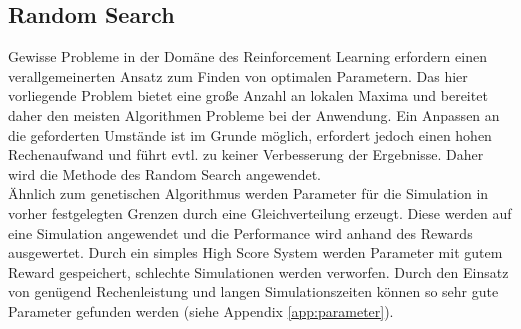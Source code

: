 	\subsection{Random Search}
		Gewisse Probleme in der Domäne des Reinforcement Learning erfordern einen verallgemeinerten Ansatz zum Finden von optimalen Parametern. Das hier vorliegende Problem bietet eine große Anzahl an lokalen Maxima und bereitet daher den meisten Algorithmen Probleme bei der Anwendung. Ein Anpassen an die geforderten Umstände ist im Grunde möglich, erfordert jedoch einen hohen Rechenaufwand und führt evtl. zu keiner Verbesserung der Ergebnisse. Daher wird die Methode des Random Search angewendet.\\
		Ähnlich zum genetischen Algorithmus werden Parameter für die Simulation in vorher festgelegten Grenzen durch eine Gleichverteilung erzeugt. Diese werden auf eine Simulation angewendet und die Performance wird anhand des Rewards ausgewertet. Durch ein simples High Score System werden Parameter mit gutem Reward gespeichert, schlechte Simulationen werden verworfen. Durch den Einsatz von genügend Rechenleistung und langen Simulationszeiten können so sehr gute Parameter gefunden werden (siehe Appendix \ref{app:parameter}).
	
